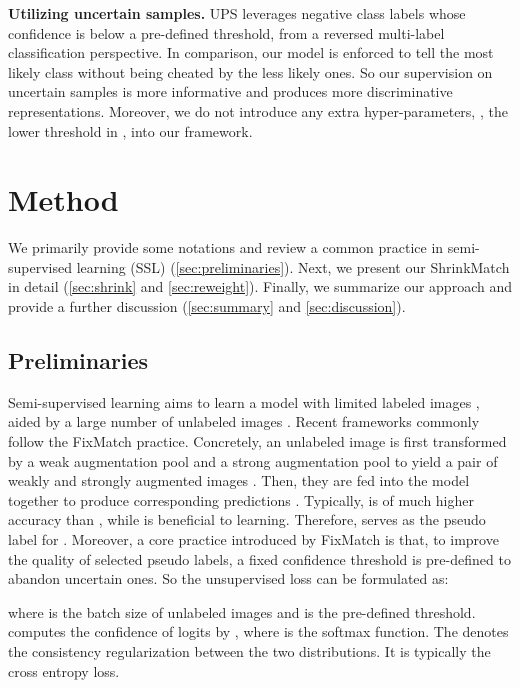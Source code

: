 \documentclass[10pt,twocolumn,letterpaper]{article}
\begin{document}
\vspace{2mm}
\noindent
\textbf{Utilizing uncertain samples.}
UPS \cite{ups} leverages negative class labels whose confidence is below a pre-defined threshold, from a reversed multi-label classification perspective. In comparison, our model is enforced to tell the most likely class without being cheated by the less likely ones. So our supervision on uncertain samples is more informative and produces more discriminative representations. Moreover, we do not introduce any extra hyper-parameters, \eg, the lower threshold in \cite{ups}, into our framework. \section{Method}

We primarily provide some notations and review a common practice in semi-supervised learning (SSL) (\cref{sec:preliminaries}). Next, we present our ShrinkMatch in detail (\cref{sec:shrink} and \cref{sec:reweight}). Finally, we summarize our approach and provide a further discussion (\cref{sec:summary} and \cref{sec:discussion}).

\subsection{\label{sec:preliminaries}Preliminaries}

Semi-supervised learning aims to learn a model with limited labeled images , aided by a large number of unlabeled images . Recent frameworks commonly follow the FixMatch practice. Concretely, an unlabeled image  is first transformed by a weak augmentation pool  and a strong augmentation pool  to yield a pair of weakly and strongly augmented images . Then, they are fed into the model together to produce corresponding predictions . Typically,  is of much higher accuracy than , while  is beneficial to learning. Therefore,  serves as the pseudo label for . Moreover, a core practice introduced by FixMatch is that, to improve the quality of selected pseudo labels, a fixed confidence threshold is pre-defined to abandon uncertain ones. So the unsupervised loss  can be formulated as:
\vspace{-2mm}

where  is the batch size of unlabeled images and  is the pre-defined threshold.  computes the confidence of logits  by , where  is the softmax function. The  denotes the consistency regularization between the two distributions. It is typically the cross entropy loss.
\end{document}
